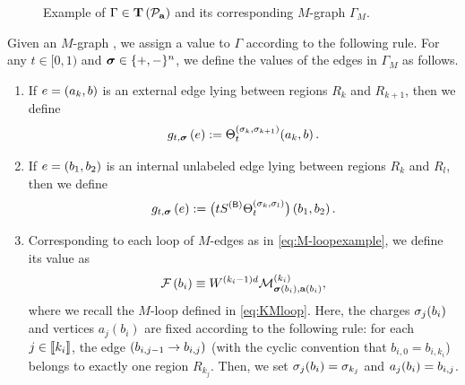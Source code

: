 \begin{figure}[h]
{}
    \caption{Example of $\Gamma \in \operatorname{{\mathbf T}}\protect\left({\mathcal{P}_{{\mathbf{a}}}}\right)$ and its corresponding $M$-graph $\Gamma_{M}$.}\label{example}
  \end{figure}


\begin{definition}\label{M-graph-value-definition}
Given an $M$-graph , we assign a value to $\Gamma$ according to the following rule. For any $t\in[0,1)$ and ${\boldsymbol{\sigma}}\in\{+,-\}^n$, we define the values of the edges in $\Gamma_{M}$ as follows. 
  \begin{enumerate}
    \item If $e = \left({a_k, b}\right)$ is an external edge lying between regions $R_k$ and $R_{k+1}$, then we define
      \begin{equation}\label{f-external2}
        g_{t,{\boldsymbol{\sigma}}}\left({e}\right) := \Theta^{\left({\sigma_{k}, \sigma_{k+1}}\right)}_{t}(a_k,b) \, .
      \end{equation}

    \item If $e = \left({b_1, b_2}\right)$ is an internal unlabeled edge lying between regions $R_k$ and $R_{l}$, then we define
      \begin{equation}\label{f-internal2}
        g_{t,{\boldsymbol{\sigma}}}\left({e}\right)
          := \big(tS^{({\mathsf{B}})}\Theta^{(\sigma_k,\sigma_{l})}_{t}\big)\left({b_1,b_2}\right) .
      \end{equation}

    \item Corresponding to each loop of $M$-edges as in \eqref{eq:M-loopexample}, we define its value as 
  \begin{equation}\label{eq:Mloop_defgen}
    \cal F\p{b_i} \equiv W^{(k_i-1)d} \cal M_{\bsig(b_i),\ba(b_i)}^{(k_i)}, %
  \end{equation}
 where we recall the $M$-loop defined in \eqref{eq:KMloop}. %
 Here, the charges $\sigma_j(b_i)$ and vertices $a_j(b_i)$ are fixed according to the following rule: for each $j \in \llbracket{k_i}\rrbracket$, the edge $\left({b_{i,j-1} \to b_{i,j}}\right)$ (with the cyclic convention that $b_{i,0}=b_{i,k_i}$) belongs to exactly one region $R_{k_j}$. Then, we set ${\sigma}_j{\left({b_i}\right)} = {\sigma}_{k_j}$ and $a_j{\left({b_i}\right)} = b_{i,j}$. 
 

\end{enumerate}
\end{definition}
